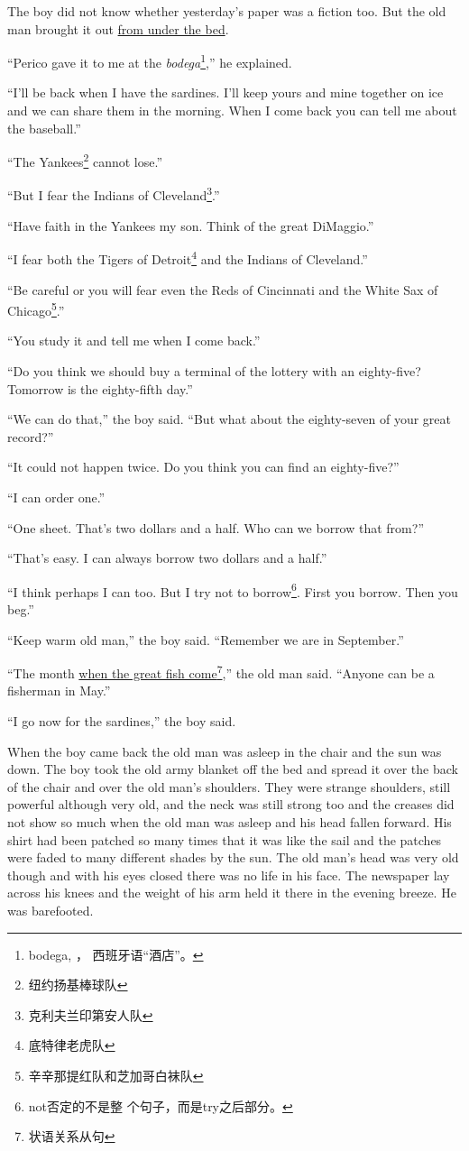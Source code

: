The boy did not know whether yesterday's paper was a fiction too. But the
old man brought it out \uline{from under the bed}.

``Perico gave it to me at the \emph{bodega}\footnote{bodega, ，
  西班牙语“酒店”。},'' he explained.

``I'll be back when I have the sardines. I'll keep yours and mine together
on ice and we can share them in the morning. When I come back you can tell
me about the baseball.''

``The Yankees\footnote{纽约扬基棒球队} cannot lose.''

``But I fear the Indians of Cleveland\footnote{克利夫兰印第安人队}.''

``Have faith in the Yankees my son. Think of the great DiMaggio.''

``I fear both the Tigers of Detroit\footnote{底特律老虎队} and the Indians of Cleveland.''

``Be careful or you will fear even the Reds of Cincinnati and the White Sax of Chicago\footnote{辛辛那提红队和芝加哥白袜队}.''

``You study it and tell me when I come back.''

``Do you think we should buy a \gls{terminal} of the lottery with an eighty-five?
Tomorrow is the eighty-fifth day.''

``We can do that,'' the boy said. ``But what about the eighty-seven of your great record?''

``It could not happen twice. Do you think you can find an eighty-five?''

``I can \gls{order} one.''

``One sheet. That's two dollars and a half. Who can we borrow that from?''

``That's easy. I can always borrow two dollars and a half.''

``I think perhaps I can too. But I try not to borrow\footnote{not否定的不是整
  个句子，而是try之后部分。}. First you borrow. Then you beg.''

``Keep warm old man,'' the boy said. ``Remember we are in September.''

``The month \uline{when the great fish come}\footnote{状语关系从句},'' the old
man said. ``Anyone can be a fisherman in May.''

``I go now for the sardines,'' the boy said.

When the boy came back the old man was \gls{asleep} in the chair and the sun was
down. The boy took the old army \gls{blanket} off the bed and \gls{spread}
it over the back of the chair and over the old man's shoulders. They were
strange shoulders, still powerful although very old, and the neck was still
strong too and the \glspl{crease} did not show so much when the old man was
asleep and his head fallen forward. His shirt had been \gls{patched} so many
times that it was like the sail and the patches were \gls{faded} to many
different \glspl{shade} by the sun. The old man's head was very old though
and with his eyes closed there was no life in his face. The newspaper
\gls{lay} across his \glspl{knee} and the weight of his arm held it there in
the evening breeze. He was \gls{barefooted}.

